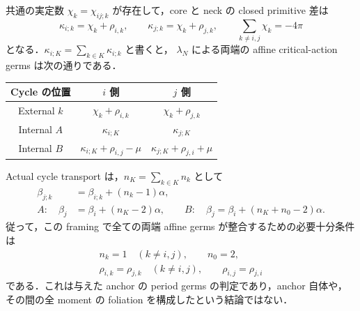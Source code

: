 \begin{proposition}
共通の実定数 $\chi_k=\chi_{ij;k}$ が存在して，core と neck の closed primitive 差は
\begin{equation}\label{ke:eq:petersen-residual-constants}
 \kappa_{i;k}=\chi_k+\rho_{i,k},\qquad
 \kappa_{j;k}=\chi_k+\rho_{j,k},\qquad
 \sum_{k\ne i,j}\chi_k=-4\pi
\end{equation}
となる．$\kappa_{i;K}=\sum_{k\in K}\kappa_{i;k}$ と書くと，
$\lambda_N$ による両端の affine critical-action germs は次の通りである．
\begin{center}
\begin{tabular}{c|c|c}
Cycle の位置 & $i$ 側 & $j$ 側\\\hline
External $k$ & $\chi_k+\rho_{i,k}$ & $\chi_k+\rho_{j,k}$\\
Internal $A$ & $\kappa_{i;K}$ & $\kappa_{j;K}$\\
Internal $B$ & $\kappa_{i;K}+\rho_{i,j}-\mu$
             & $\kappa_{j;K}+\rho_{j,i}+\mu$
\end{tabular}
\end{center}
Actual cycle transport は，$n_K=\sum_{k\in K}n_k$ として
\begin{align}
 \beta_{j;k}&=\beta_{i;k}+(n_k-1)\alpha,
       \label{ke:eq:petersen-external-shear}\\
 A:\quad\beta_j&=\beta_i+(n_K-2)\alpha,\qquad
 B:\quad\beta_j=\beta_i+(n_K+n_0-2)\alpha .
       \label{ke:eq:petersen-internal-shear}
\end{align}
従って，この framing で全ての両端 affine germs が整合するための必要十分条件は
\begin{equation}\label{ke:eq:petersen-finite-matching}
 \begin{gathered}
 n_k=1\quad(k\ne i,j),\qquad n_0=2,\\
 \rho_{i,k}=\rho_{j,k}\quad(k\ne i,j),\qquad
 \rho_{i,j}=\rho_{j,i}
 \end{gathered}
\end{equation}
である．これは与えた anchor の period germs の判定であり，anchor 自体や，
その間の全 moment の foliation を構成したという結論ではない．
\end{proposition}

